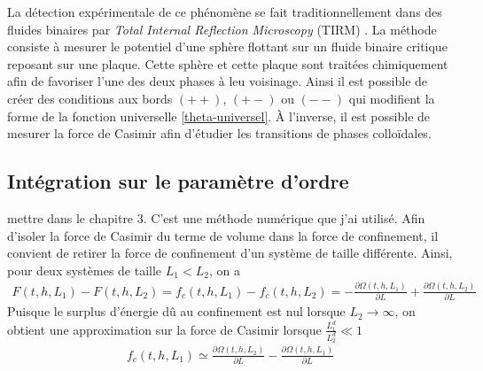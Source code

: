 La détection expérimentale de ce phénomène se fait traditionnellement dans des fluides binaires par \textit{Total Internal Reflection Microscopy} (TIRM) \cite{fukuto_critical_2005,hertlein_direct_2008,gambassi_critical_2009,edison_critical_2015-1}. La méthode consiste à mesurer le potentiel d'une sphère flottant sur un fluide binaire critique reposant sur une plaque. Cette sphère et cette plaque sont traitées chimiquement afin de favoriser l'une des deux phases à leu voisinage. Ainsi il est possible de créer des conditions aux bords $(++)$, $(+-)$ ou $(--)$ qui modifient la forme de la fonction universelle \ref{theta-universel}. À l'inverse, il est possible de mesurer la force de Casimir \cite{nguyen_controlling_2013} afin d'étudier les transitions de phases colloïdales.



    \subsection{Intégration sur le paramètre d'ordre}
{\color{red} mettre dans le chapitre 3. C'est une méthode numérique que j'ai utilisé.}
Afin d'isoler la force de Casimir du terme de volume dans la force de confinement, il convient de retirer la force de confinement d'un système de taille différente. Ainsi, pour deux systèmes de taille $L_1 \less L_2$, on a 
\begin{align}
    F(t,h,L_1) - F(t,h,L_2) = f_c(t,h,L_1) - f_c(t,h,L_2) =  - \frac{\partial \Omega(t,h,L_1)}{\partial L}  + \frac{\partial \Omega(t,h,L_2)}{\partial L} 
\end{align}
Puisque le surplus d'énergie dû au confinement est nul lorsque $L_2\to \infty$, on obtient une approximation sur la force de Casimir lorsque $\frac{L_1^d}{L_2^d} \ll 1$ 
\begin{align}
    f_c(t,h,L_1) \simeq  \frac{\partial \Omega(t,h,L_2)}{\partial L}  - \frac{\partial \Omega(t,h,L_1)}{\partial L} 
    \label{casimir-diff-omega}   
\end{align}

